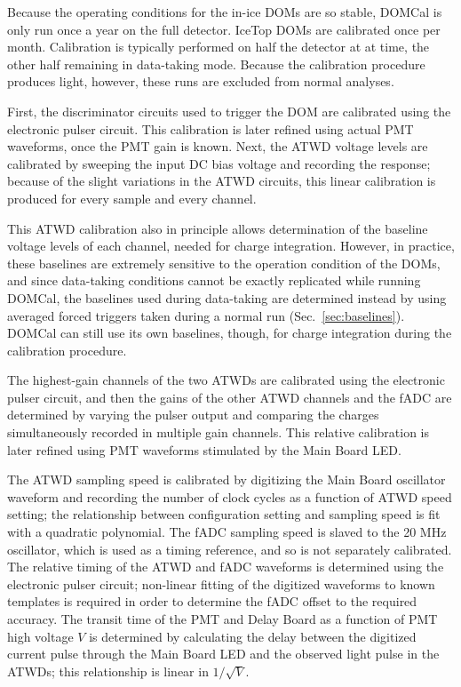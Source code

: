Because the operating conditions for
the in-ice DOMs are so stable, DOMCal is only run once a year on the full
detector. IceTop DOMs are calibrated once per month.  Calibration is
typically performed on half the detector at at time, the other half
remaining in data-taking mode.  Because the calibration procedure produces
light, however, these runs are excluded from normal analyses.

First, the discriminator circuits used to trigger the DOM are calibrated
using the electronic pulser circuit.  This calibration is later refined using actual
PMT waveforms, once the PMT gain is known.  Next, the ATWD voltage levels
are calibrated by sweeping the input DC bias voltage and recording the
response; because of the slight variations in the ATWD circuits, this
linear calibration is produced for every sample and every channel.

This ATWD calibration also in principle allows determination of the baseline
voltage levels of each channel, needed for charge integration.  However, in
practice, these baselines are extremely sensitive to the operation
condition of the DOMs, and since data-taking conditions cannot be exactly
replicated while running DOMCal, the baselines used during data-taking are
determined instead by using averaged forced triggers taken during a normal
run (Sec.~\ref{sec:baselines}).  DOMCal can still use its own baselines,
though, for charge integration during the calibration procedure.

The highest-gain channels of the two ATWDs are calibrated using the electronic
pulser circuit, and then the gains of the other ATWD channels and the fADC
are determined by varying the pulser output and comparing the charges
simultaneously recorded in multiple gain channels.  This relative
calibration is later refined using PMT waveforms stimulated by the Main
Board LED.

The ATWD sampling speed is calibrated by digitizing the Main Board oscillator
waveform and recording the number of clock cycles as a function of ATWD
speed setting; the relationship between configuration setting and sampling
speed is fit with a quadratic polynomial.  The fADC sampling speed is
slaved to the 20 MHz oscillator, which is used as a timing reference, and
so is not separately calibrated.  The relative timing of 
the ATWD and fADC waveforms is determined using the electronic pulser circuit;
non-linear fitting of the digitized waveforms to known templates is
required in order to determine the fADC offset to the required accuracy.
The transit time of the PMT and Delay Board as a function of PMT high
voltage $V$ is determined by calculating the delay between the digitized
current pulse through the Main Board LED and the observed light pulse in
the ATWDs; this relationship is linear in $1/\sqrt{V}$.


